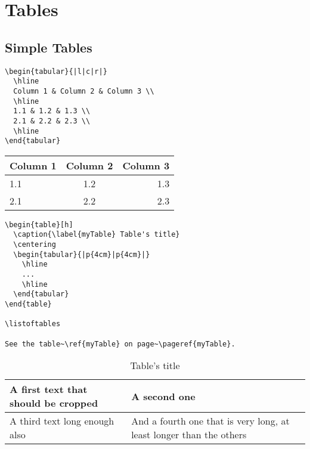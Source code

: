 \chapter{Tables}

\section{Simple Tables}

\begin{LaTeXsource}
\begin{verbatim}
\begin{tabular}{|l|c|r|}
  \hline
  Column 1 & Column 2 & Column 3 \\
  \hline
  1.1 & 1.2 & 1.3 \\
  2.1 & 2.2 & 2.3 \\
  \hline
\end{tabular}
\end{verbatim}
\end{LaTeXsource}

\begin{Results}
\begin{tabular}{|l|c|r|}
  \hline
  Column 1 & Column 2 & Column 3 \\
  \hline
  1.1 & 1.2 & 1.3 \\
  2.1 & 2.2 & 2.3 \\
  \hline
\end{tabular}
\end{Results}

\pagebreak
\begin{LaTeXsource}[Floating]
\begin{verbatim}
\begin{table}[h]
  \caption{\label{myTable} Table's title}
  \centering
  \begin{tabular}{|p{4cm}|p{4cm}|}
    \hline
    ...
    \hline
  \end{tabular}
\end{table}

\listoftables

See the table~\ref{myTable} on page~\pageref{myTable}.
\end{verbatim}
\end{LaTeXsource}

\begin{table}[h]
  \caption{\label{myTable} Table's title}
  \centering
  \begin{tabular}{|p{4cm}|p{4cm}|}
    \hline
      A first text that should be cropped &
      A second one \\
    \hline
      A third text long enough also &
      And a fourth one that is very long,
      at least longer than the others \\
    \hline
  \end{tabular}
\end{table}

